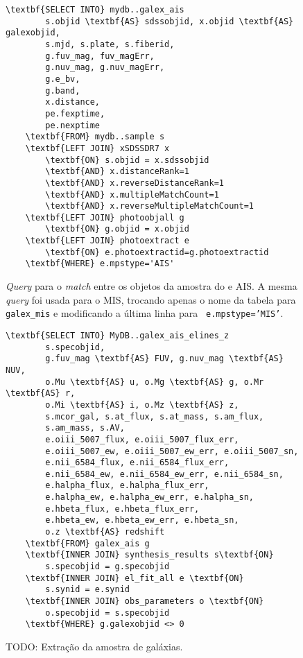 \begin{figure}
	\begin{Verbatim}[commandchars=\\\{\}]
	\textbf{SELECT INTO} mydb..galex_ais
		s.objid \textbf{AS} sdssobjid, x.objid \textbf{AS} galexobjid,
		s.mjd, s.plate, s.fiberid,
		g.fuv_mag, fuv_magErr,
		g.nuv_mag, g.nuv_magErr,
		g.e_bv,
		g.band,
		x.distance,
		pe.fexptime,
		pe.nexptime
	\textbf{FROM} mydb..sample s
	\textbf{LEFT JOIN} xSDSSDR7 x
		\textbf{ON} s.objid = x.sdssobjid
		\textbf{AND} x.distanceRank=1
		\textbf{AND} x.reverseDistanceRank=1
		\textbf{AND} x.multipleMatchCount=1
		\textbf{AND} x.reverseMultipleMatchCount=1
	\textbf{LEFT JOIN} photoobjall g
		\textbf{ON} g.objid = x.objid
	\textbf{LEFT JOIN} photoextract e
		\textbf{ON} e.photoextractid=g.photoextractid
	\textbf{WHERE} e.mpstype='AIS'
	\end{Verbatim}
	\caption[{\em Match} entre os objetos da amostra do \starlight e \galex.]
	{{\em Query} para o {\em match} entre os objetos da amostra do \starlight e
	\galex AIS. A mesma {\em query} foi usada para o MIS, trocando apenas o nome da
	tabela para {\tt galex\_mis} e modificando a última linha para {\tt
	e.mpstype='MIS'}.}
	\label{fig:QueryMatchAIS}
\end{figure}

\begin{figure}
	\begin{Verbatim}[commandchars=\\\{\}]
	\textbf{SELECT INTO} MyDB..galex_ais_elines_z
		s.specobjid,
		g.fuv_mag \textbf{AS} FUV, g.nuv_mag \textbf{AS} NUV,
		o.Mu \textbf{AS} u, o.Mg \textbf{AS} g, o.Mr \textbf{AS} r,
		o.Mi \textbf{AS} i, o.Mz \textbf{AS} z,
		s.mcor_gal, s.at_flux, s.at_mass, s.am_flux,
		s.am_mass, s.AV,
		e.oiii_5007_flux, e.oiii_5007_flux_err,
		e.oiii_5007_ew, e.oiii_5007_ew_err, e.oiii_5007_sn,
		e.nii_6584_flux, e.nii_6584_flux_err,
		e.nii_6584_ew, e.nii_6584_ew_err, e.nii_6584_sn,
		e.halpha_flux, e.halpha_flux_err,
		e.halpha_ew, e.halpha_ew_err, e.halpha_sn,
		e.hbeta_flux, e.hbeta_flux_err,
		e.hbeta_ew, e.hbeta_ew_err, e.hbeta_sn,
		o.z \textbf{AS} redshift
	\textbf{FROM} galex_ais g
	\textbf{INNER JOIN} synthesis_results s\textbf{ON}
		s.specobjid = g.specobjid
	\textbf{INNER JOIN} el_fit_all e \textbf{ON}
		s.synid = e.synid
	\textbf{INNER JOIN} obs_parameters o \textbf{ON}
		o.specobjid = s.specobjid
	\textbf{WHERE} g.galexobjid <> 0
	\end{Verbatim}
	\caption[Extração da amostra de galáxias.]
	{TODO: Extração da amostra de galáxias.}
	\label{fig:QuerySampleAIS}
\end{figure}


